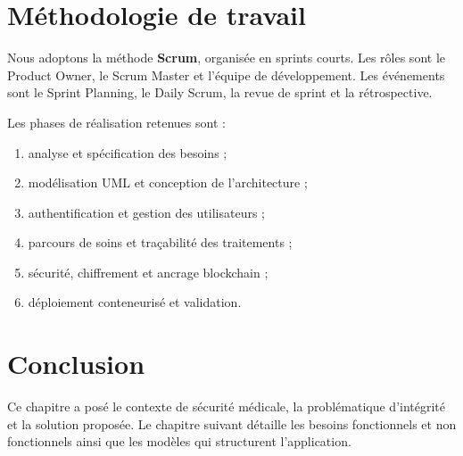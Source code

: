 \section{Méthodologie de travail}

Nous adoptons la méthode \textbf{Scrum}, organisée en sprints courts. Les rôles sont le Product Owner, le Scrum Master et l'équipe de développement. Les événements sont le Sprint Planning, le Daily Scrum, la revue de sprint et la rétrospective.



Les phases de réalisation retenues sont :


\begin{enumerate}
    \item analyse et spécification des besoins ;
    \item modélisation UML et conception de l'architecture ;
    \item authentification et gestion des utilisateurs ;
    \item parcours de soins et traçabilité des traitements ;
    \item sécurité, chiffrement et ancrage blockchain ;
    \item déploiement conteneurisé et validation.
\end{enumerate}





\section{Conclusion}

Ce chapitre a posé le contexte de sécurité médicale, la problématique d'intégrité et la solution proposée. Le chapitre suivant détaille les besoins fonctionnels et non fonctionnels ainsi que les modèles qui structurent l'application.
